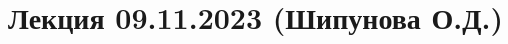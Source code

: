 \documentclass[main.tex]{subfiles}
\begin{document}
\section{Лекция 09.11.2023 (Шипунова О.Д.)}
\end{document}

